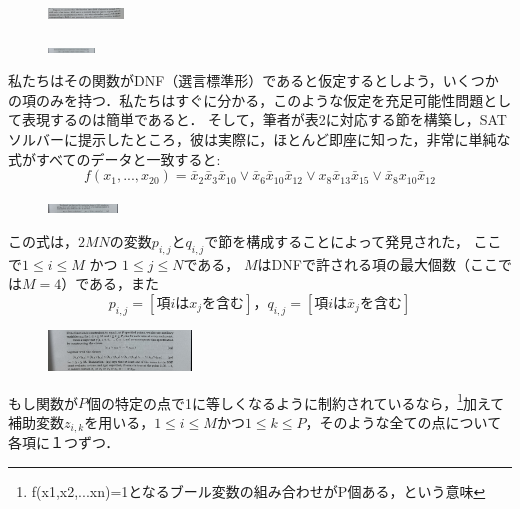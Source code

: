 \documentclass[dvipdfmx,a4paper,12pt]{jsarticle}
\begin{document}
\newpage
\begin{figure}[htbp]
  \centering
  \includegraphics[width=20mm,angle=270]{images/2.jpg}
\end{figure}
\begin{figure}[htbp]
  \centering
  \includegraphics[width=12.5mm,angle=270]{images/3.jpg}
\end{figure}
私たちはその関数がDNF（選言標準形）であると仮定するとしよう，いくつかの項のみを持つ．私たちはすぐに分かる，このような仮定を充足可能性問題として表現するのは簡単であると．
そして，筆者が表2に対応する節を構築し，SATソルバーに提示したところ，彼は実際に，ほとんど即座に知った，非常に単純な式がすべてのデータと一致すると:
\setcounter{equation}{26}
\begin{equation}
f(x_{1},...,x_{20}) = \bar{x}_{2}\bar{x}_{3}\bar{x}_{10}\lor\bar{x}_{6}\bar{x}_{10}\bar{x}_{12}\lor x_{8}\bar{x}_{13}\bar{x}_{15}\lor \bar{x}_{8}x_{10}\bar{x}_{12} 
\end{equation}  
\begin{figure}[htbp]
  \centering
  \includegraphics[width=18.5mm,angle=270]{images/2-2.jpg}
\end{figure}

この式は，$2MN$の変数$p_{i,j}$と$q_{i,j}$で節を構成することによって発見された，
ここで$1 \le i \le M$ かつ $1 \le j \le N$である，
$M$はDNFで許される項の最大個数（ここでは$M = 4$）である，また
\begin{equation}
p_{i,j} = [ 項iはx_{j}を含む]，q_{i,j} = [ 項iは\bar{x}_{j}を含む] 
\end{equation}
\clearpage
\begin{figure}[htbp]
  \centering
  \includegraphics[width=38mm,angle=270]{images/2-3.jpg}
\end{figure}
もし関数が$P$個の特定の点で1に等しくなるように制約されているなら，\footnote{f(x1,x2,...xn)=1となるブール変数の組み合わせがP個ある，という意味}加えて補助変数$z_{i,k}$を用いる，$1 \le i \le M$かつ$1 \le k \le P$，そのような全ての点について各項に１つずつ．
\end{document}
